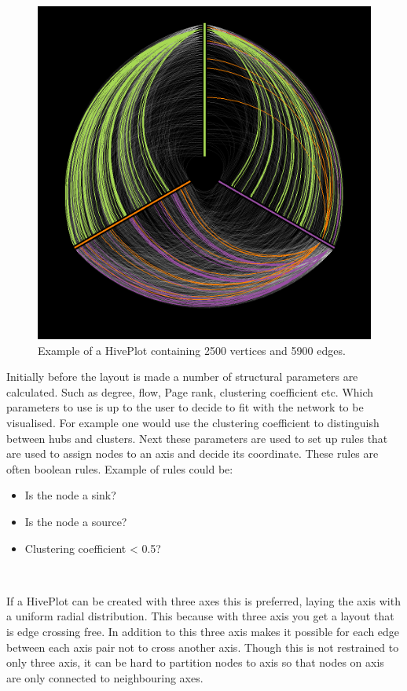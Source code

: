 \documentclass[a4paper,11pt]{kth-mag}
\begin{document}
\begin{figure}[!htbp]
	\centering
	\includegraphics[scale=0.5]{hiveplotEx1}
	\caption{Example of a HivePlot containing 2500 vertices and 5900 edges.}
	\label{fig:hive_plot}
\end{figure}

Initially before the layout is made a number of structural parameters are calculated. Such as degree, flow, Page rank, clustering coefficient etc. Which parameters to use is up to the user to decide to fit with the network to be
visualised. For example one would use the clustering coefficient to distinguish between hubs and clusters. Next these parameters are used to set up rules that are used to assign nodes to an axis and decide its coordinate. These rules
are often boolean rules. Example of rules could be: \
\begin{itemize}
	\item{Is the node a sink?}
	\item{Is the node a source?}
	\item{Clustering coefficient < 0.5?}
\end{itemize}
\

If a HivePlot can be created with three axes this is preferred\cite{Krzywinski01092012}, laying the axis with a uniform radial distribution. This because with three axis you get a layout that is edge crossing free. In addition to this 
three axis makes it possible for each edge between each axis pair not to cross another axis. Though this is not restrained to only three axis, it can be hard to partition nodes to axis so that nodes on axis are only connected
to neighbouring axes.
\end{document}
